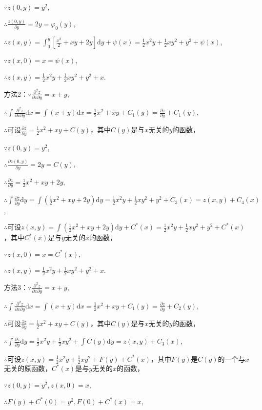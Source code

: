 \documentclass[12pt,UTF8]{ctexart}
\begin{document}
\begin{enumerate}
$\because z(0,y)=y^2$,

$\therefore\frac{z(0,y)}{\partial y}=2y=\varphi_0(y)$,

$\therefore z(x,y)=\int_0^y[\frac{x^2}2+xy+2y]\mathrm dy+\psi(x)=\frac12x^2y+\frac12xy^2+y^2+\psi(x)$,

$\because z(x,0)=x=\psi(x)$,

$\therefore z(x,y)=\frac12x^2y+\frac12xy^2+y^2+x$.

方法2：$\because\frac{\partial^2z}{\partial x\partial y}=x+y$,

$\therefore\int\frac{\partial^2z}{\partial x\partial y}\mathrm dx=\int(x+y)\mathrm dx=\frac12x^2+xy+C_1(y)=\frac{\partial z}{\partial y}+C_1(y)$,

$\therefore$可设$\frac{\partial z}{\partial y}=\frac12x^2+xy+C(y)$，其中$C(y)$是与$x$无关的$y$的函数，

$\because z(0,y)=y^2$,

$\therefore\frac{\partial z(0,y)}{\partial y}=2y=C(y)$,

$\therefore\frac{\partial z}{\partial y}=\frac12x^2+xy+2y$,

$\therefore\int\frac{\partial z}{\partial y}\mathrm dy=\int(\frac12x^2+xy+2y)\mathrm dy=\frac12x^2y+\frac12xy^2+y^2+C_3(x)=z(x,y)+C_4(x)$,

$\therefore$可设$z(x,y)=\int(\frac12x^2+xy+2y)\mathrm dy+C^*(x)=\frac12x^2y+\frac12xy^2+y^2+C^*(x)$，其中$C^*(x)$是与$y$无关的$x$的函数，

$\because z(x,0)=x=C^*(x)$,

$\therefore z(x,y)=\frac12x^2y+\frac12xy^2+y^2+x$.

方法3：$\because\frac{\partial^2z}{\partial x\partial y}=x+y$,

$\therefore\int\frac{\partial^2z}{\partial x\partial y}\mathrm dx=\int(x+y)\mathrm dx=\frac12x^2+xy+C_1(y)=\frac{\partial z}{\partial y}+C_2(y)$,

$\therefore$可设$\frac{\partial z}{\partial y}=\frac12x^2+xy+C(y)$，其中$C(y)$是与$x$无关的$y$的函数，

$\therefore\int\frac{\partial z}{\partial y}\mathrm dy=\frac12x^2y+\frac12xy^2+\int C(y)\mathrm dy=z(x,y)+C_3(x)$,

$\therefore$可设$z(x,y)=\frac12x^2y+\frac12xy^2+F(y)+C^*(x)$，其中$F(y)$是$C(y)$的一个与$x$无关的原函数，$C^*(x)$是与$y$无关的$x$的函数，

$\because z(0,y)=y^2,z(x,0)=x$,

$\therefore F(y)+C^*(0)=y^2,F(0)+C^*(x)=x$,


\end{enumerate}
\end{document}
